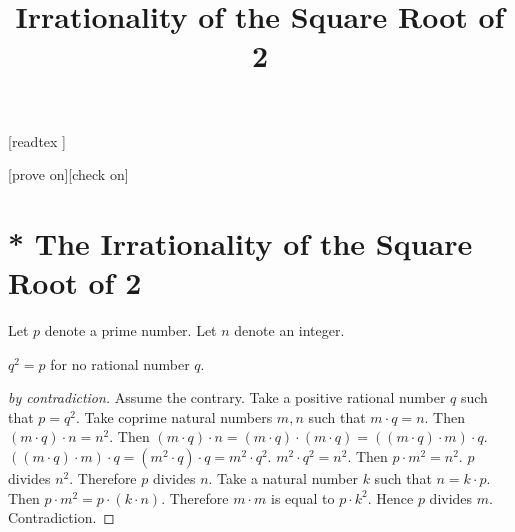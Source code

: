 \documentclass{article}
\title{Irrationality of the Square Root of 2}
\author{}
\date{}
\begin{document}
\maketitle

\begin{forthel}

    [readtex ]

    [prove on][check on]
  \end{forthel}

\section{* The Irrationality of the Square Root of 2}



\begin{forthel}

Let $p$ denote a prime number.
Let $n$ denote an integer.


\begin{proposition}
    $q^{2} = p$ for no rational number $q$.
\end{proposition}
\begin{proof}[by contradiction]
    Assume the contrary.
    Take a positive rational number $q$ such that $p = q^{2}$.
    Take coprime natural numbers $m,n$ such that $m \cdot q = n$.
    Then $(m \cdot q) \cdot n = n^{2}$. 
    Then  $(m \cdot q) \cdot n = (m \cdot q) \cdot (m \cdot q) = ((m \cdot q) \cdot m) \cdot q$.
    $((m \cdot q) \cdot m) \cdot q  = (m^{2} \cdot q) \cdot q = m^{2} \cdot q^{2}$.
    $m^{2} \cdot q^{2} = n^{2}.$
    Then $p \cdot m^{2} = n^{2}$.
    $p$ divides $n^{2}$. Therefore $p$ divides $n$.
    Take a natural number $k$ such that $n = k \cdot p$.
    Then $p \cdot m^{2} = p \cdot (k \cdot n)$.
    Therefore $m \cdot m$ is equal to $p \cdot k^{2}$.
    Hence $p$ divides $m$.
    Contradiction.
\end{proof}
\end{forthel}
\end{document}
